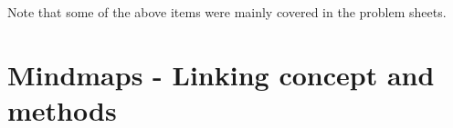\documentclass[
  letterpaper,
  enabledeprecatedfontcommands]{report}
\begin{document}
Note that some of the above items were mainly covered in the problem
sheets.

\chapter{Mindmaps - Linking concept and
methods}\label{mindmaps---linking-concept-and-methods}
\end{document}

